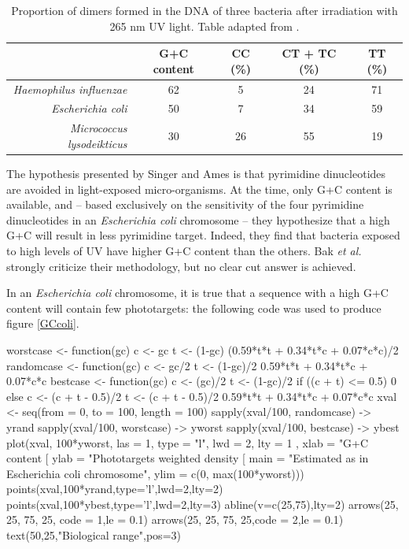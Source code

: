 \documentclass{article}
\begin{document}
\begin{table}[H]
\begin{center}
\begin{tabular}{rcccc}
  \hline \hline
  & G+C content & CC (\%) & CT + TC (\%) & TT (\%)\\
  \hline
  \textit{Haemophilus influenzae} & 62 & 5 & 24 & 71 \\
  \textit{Escherichia coli} & 50 & 7 & 34 & 59 \\
  \textit{Micrococcus lysodeikticus} & 30 & 26 & 55 & 19 \\
  \hline \hline
\end{tabular}
\caption{Proportion of dimers formed in the DNA of three bacteria
  after irradiation with 265 nm UV light. Table adapted from
  \cite{Setlow}.}
\label{sensitivity}
\end{center}
\end{table}



The hypothesis presented by Singer and Ames \cite{Singer} is that
pyrimidine dinucleotides are avoided in light-exposed micro-organisms.
At the time, only G+C content is available, and -- based exclusively
on the sensitivity of the four pyrimidine dinucleotides in an
\textit{Escherichia coli} chromosome -- they hypothesize that a high
G+C will result in less pyrimidine target. Indeed, they find that
bacteria exposed to high levels of UV have higher G+C content than the
others. Bak \textit{et al.} \cite{Bak} strongly criticize their
methodology, but no clear cut answer is achieved.

In an \textit{Escherichia coli} chromosome, it is true that a sequence
with a high G+C content will contain few phototargets: the following
code was used to produce figure \ref{GCcoli}.

\begin{Schunk}
\begin{Sinput}
 worstcase <- function(gc){
   c <- gc
   t <- (1-gc)
   (0.59*t*t + 0.34*t*c + 0.07*c*c)/2
 }
 randomcase <- function(gc){
   c <- gc/2
   t <- (1-gc)/2
   0.59*t*t + 0.34*t*c + 0.07*c*c
 }
 bestcase <- function(gc){
   c <- (gc)/2
   t <- (1-gc)/2
   if ((c + t) <= 0.5){
     0
   } else {
   c <- (c + t - 0.5)/2
   t <- (c + t - 0.5)/2
   0.59*t*t + 0.34*t*c + 0.07*c*c
   }
 }
 xval <- seq(from = 0, to = 100, length = 100)
 sapply(xval/100, randomcase) -> yrand
 sapply(xval/100, worstcase) -> yworst
 sapply(xval/100, bestcase) -> ybest
 plot(xval, 100*yworst, las = 1, type = "l", lwd = 2, lty = 1 ,
 xlab = "G+C content [%
 ylab = "Phototargets weighted density [%
 main = "Estimated as in Escherichia coli chromosome",
 ylim = c(0, max(100*yworst)))
 points(xval,100*yrand,type='l',lwd=2,lty=2)
 points(xval,100*ybest,type='l',lwd=2,lty=3)
 abline(v=c(25,75),lty=2)
 arrows(25, 25, 75, 25, code = 1,le = 0.1)
 arrows(25, 25, 75, 25,code = 2,le = 0.1)
 text(50,25,"Biological range",pos=3)
\end{Sinput}
\end{Schunk}
\end{document}
